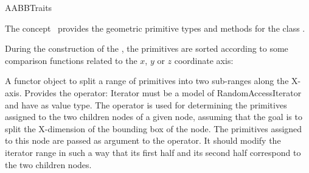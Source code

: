 \ccRefPageBegin


\begin{ccRefConcept}{AABBTraits}


\ccDefinition
  
The concept \ccRefName\ provides the geometric primitive types and methods for the class .

\ccTypes








During the construction of the , the primitives are sorted according to some comparison functions related to the $x$, $y$ or $z$ coordinate axis:

{A functor object to split a range of primitives into two sub-ranges along the X-axis. Provides the operator:
 Iterator  must be a model of RandomAccessIterator and have  as value type. The operator is used for determining the primitives assigned to the two children nodes of a given node, assuming that the goal is to split the X-dimension of the bounding box of the node. The primitives assigned to this node are passed as argument to the operator. It should modify the iterator range in such a way that its first half and its second half correspond to the two children nodes.}


\end{ccRefConcept}
